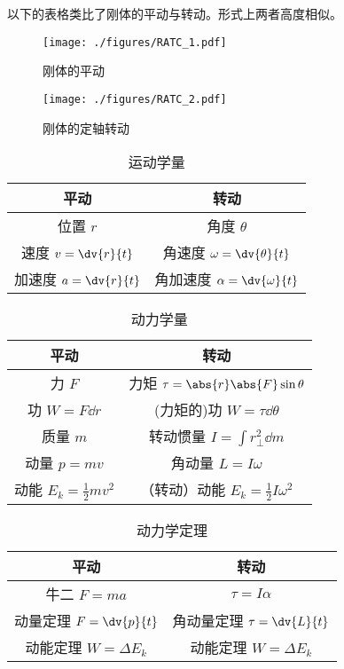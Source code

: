 
以下的表格类比了刚体的平动与转动。形式上两者高度相似。
\begin{figure}[ht]
\centering
\texttt{[image: ./figures/RATC\_1.pdf]}
\caption{刚体的平动} \label{RATC_fig1}
\end{figure}

\begin{figure}[ht]
\centering
\texttt{[image: ./figures/RATC\_2.pdf]}
\caption{刚体的定轴转动} \label{RATC_fig2}
\end{figure}

\begin{table}[ht]
\centering
\caption{运动学量}\label{RATC_tab1}
\begin{tabular}{|c|c|}
\hline
平动&转动\\
\hline
位置 $r$ & 角度 $\theta$ \\
\hline
速度 $v=\dv{r}{t}$ & 角速度 $\omega = \dv{\theta}{t}$ \\
\hline
加速度 $a = \dv{r}{t}$ & 角加速度 $\alpha = \dv{\omega}{t}$ \\
\hline
\end{tabular}
\end{table}

\begin{table}[ht]
\centering
\caption{动力学量}\label{RATC_tab2}
\begin{tabular}{|c|c|}
\hline
平动&转动\\
\hline
力 $F$ & 力矩 $\tau=\abs{r}\abs{F} \sin \theta$\\
\hline 
功 $W = F \dd r$ & (力矩的)功 $W=\tau \dd \theta$\\
\hline
质量 $m$ & 转动惯量 $I = \int r_\perp^2 \dd m$ \\
\hline
动量 $p=mv$ & 角动量 $L=I\omega$ \\
\hline
动能 $E_k = \frac{1}{2}mv^2$ & （转动）动能 $E_k = \frac{1}{2} I\omega^2$ \\
\hline
\end{tabular}
\end{table}

\begin{table}[ht]
\centering
\caption{动力学定理}\label{RATC_tab3}
\begin{tabular}{|c|c|}
\hline
平动&转动\\
\hline 
牛二 $F=ma$& $\tau = I \alpha$\\
\hline
动量定理 $F=\dv{p}{t}$ & 角动量定理 $\tau=\dv{L}{t}$ \\
\hline
动能定理 $W = \Delta E_k$ & 动能定理 $W = \Delta E_k$ \\
\hline
\end{tabular}
\end{table}